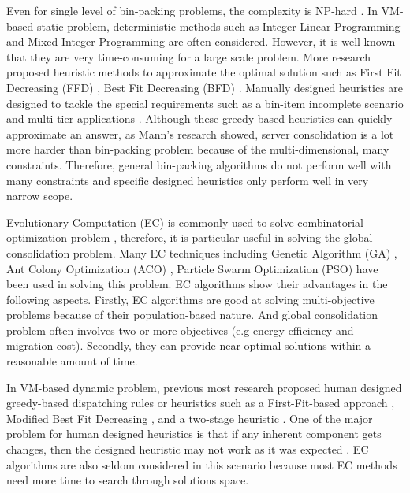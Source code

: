 Even for single level of bin-packing problems, the complexity is NP-hard .
In VM-based static problem, deterministic methods such as  
Integer Linear Programming \cite{Speitkamp:2010ck} and Mixed
Integer Programming \cite{Wang:2016eh} are often considered. However, it is well-known that they are very time-consuming for a large scale problem. More research proposed heuristic methods
 to approximate the optimal solution such as 
First Fit Decreasing (FFD) \cite{Panigrahy:2011wk}, Best Fit Decreasing (BFD) \cite{Beloglazov:2012ji}.
Manually designed heuristics are designed to tackle the special requirements such 
as a bin-item incomplete scenario \cite{Gupta:2008ul} and multi-tier applications \cite{Jung:2008vb, Li:2009wf}. Although these greedy-based heuristics can quickly approximate an answer,  as Mann's research \cite{Mann:2015ua} showed, server consolidation is a lot more harder than bin-packing problem because of the multi-dimensional, many constraints. Therefore, general bin-packing algorithms do not perform well with many constraints and specific designed heuristics only perform well in very narrow scope.

Evolutionary Computation (EC) is commonly used to solve combinatorial optimization problem \cite{Guzek:2015ds}, therefore, it is particular useful in solving the global consolidation problem.  Many EC techniques including Genetic Algorithm (GA) \cite{Xu:2010vh}, Ant Colony Optimization (ACO) \cite{Gao:2013gg, Mateos:2013bm}, Particle Swarm Optimization (PSO) \cite{Jeyarani:2012fg} have been used in solving this problem. EC algorithms show their advantages in the following aspects. Firstly, EC algorithms are good at solving multi-objective problems because of their population-based nature. And global consolidation problem often involves two or more objectives (e.g energy efficiency and migration cost). Secondly,  they can provide near-optimal solutions within a reasonable amount of time.  

In VM-based dynamic problem, 
previous most research proposed human designed greedy-based dispatching rules or heuristics such as a First-Fit-based approach \cite{Bobroff:2007ec}, Modified Best Fit Decreasing \cite{Beloglazov:2012ji}, and a two-stage heuristic \cite{Zhang:2015jm}. One of the major problem for human designed heuristics is that if any inherent component gets changes, then the designed heuristic may not work as it was expected \cite{SoteloFigueroa:2013be}. EC algorithms are also seldom considered in this scenario because most EC methods need more time to search through solutions space.


